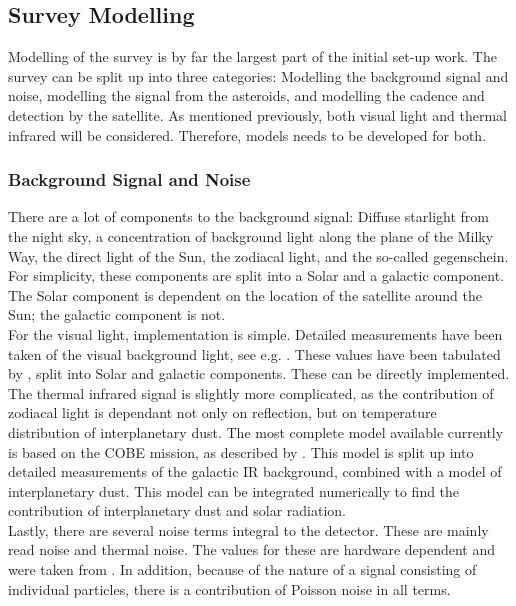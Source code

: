 \documentclass[12pt, english, NoHyper]{AE4010-template}
\begin{document}
\subsection{Survey Modelling}
Modelling of the survey is by far the largest part of the initial set-up work. The survey can be split up into three categories: Modelling the background signal and noise, modelling the signal from the asteroids, and modelling the cadence and detection by the satellite. As mentioned previously, both visual light and thermal infrared will be considered. Therefore, models needs to be developed for both.

\subsubsection{Background Signal and Noise}
There are a lot of components to the background signal: Diffuse starlight from the night sky, a concentration of background light along the plane of the Milky Way, the direct light of the Sun, the zodiacal light, and the so-called gegenschein. For simplicity, these components are split into a Solar and a galactic component. The Solar component is dependent on the location of the satellite around the Sun; the galactic component is not. \\

For the visual light, implementation is simple. Detailed measurements have been taken of the visual background light, see e.g. \cite{LightOfTheNightSky}. These values have been tabulated by \cite{DiffuseSkyBrightness}, split into Solar and galactic components. These can be directly implemented. \\

The thermal infrared signal is slightly more complicated, as the contribution of zodiacal light is dependant not only on reflection, but on temperature distribution of interplanetary dust. The most complete model available currently is based on the COBE mission, as described by \cite{COBEIRBackground}. This model is split up into detailed measurements of the galactic IR background, combined with a model of interplanetary dust. This model can be integrated numerically to find the contribution of interplanetary dust and solar radiation. \\

Lastly, there are several noise terms integral to the detector. These are mainly read noise and thermal noise. The values for these are hardware dependent and were taken from \cite{NEOSDT2}. In addition, because of the nature of a signal consisting of individual particles, there is a contribution of Poisson noise in all terms.
\end{document}
